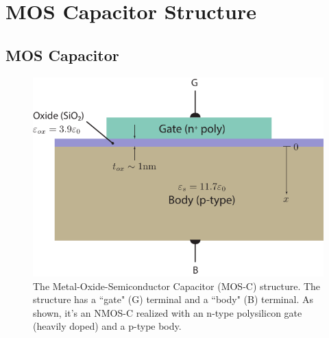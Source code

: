 \section{MOS Capacitor Structure}
\subsection{MOS Capacitor}
\begin{figure}[tbh]
\begin{center}
\includegraphics[width=.65\columnwidth]{mos_cap_structure}
\end{center}
\caption{The Metal-Oxide-Semiconductor Capacitor  (MOS-C) structure.  The structure has a ``gate" (G) terminal and a ``body" (B) terminal.  As shown, it's an NMOS-C realized with an n-type polysilicon gate (heavily doped) and a p-type body.  } \label{fig:mos_cap}
\end{figure}

